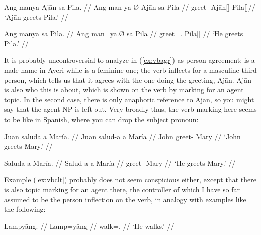 \pex %
\a\label{ex:vbagr}\begingl
	\gla Ang manya {} Ajān sa Pila. //
	\glb Ang man-ya Ø Ajān sa Pila //
	\glc \AgtT{} greet-\TsgM{} \Top{} ​Ajān[\TsgM{}] \Parg{} Pila[\TsgF{}]//
	\glft `Ajān greets Pila.' //
\endgl

\a\label{ex:vbclt}\begingl
	\gla Ang manya sa Pila. //
	\glb Ang man=ya.Ø sa ​Pila //
	\glc \AgtT{} greet=\TsgM{}.\Top{} \Parg{} ​Pila[\TsgF{}] //
	\glft `He greets Pila.' //
\endgl

\xe

It is probably uncontroversial to analyze  in (\ref{ex:vbagr}) as 
person agreement:  is a male name in Ayeri while 
 is a feminine one; the verb inflects for a masculine third 
person, which tells us that it agrees with the one doing the greeting, 
Ajān. Ajān is also who this is about, which is shown on the verb by marking for 
an agent topic. In the second case, there is only anaphoric reference to Ajān, 
so you might say that the agent NP is left out. Very broadly thus, the verb 
marking here seems to be like in Spanish, where you can drop the subject 
pronoun:

\pex %
\a\label{ex:vbagrspann}\begingl{}%
	\gla Juan saluda a María. //
	\glb Juan salud-a a María //
	\glc John greet-\Tsg{} \Acc{} Mary //
	\glft `John greets Mary.' //
\endgl

\a\label{ex:vbagrspapr}\begingl
	\gla Saluda a María. //
	\glb Salud-a a María //
	\glc greet-\Tsg{} \Acc{} Mary //
	\glft `He greets Mary.' //
\endgl

\xe

Example (\ref{ex:vbclt}) probably does not seem conspicious either, except that 
there is also topic marking for an agent there, the controller of which I have 
so far assumed to be the person inflection on the verb, in analogy 
with examples like the following:

\ex\label{ex:lampyaang} %
\begingl
	\gla Lampyāng. //
	\glb Lamp=yāng //
	\glc walk=\TsgM{}.\Aarg{} //
	\glft `He walks.' //
\endgl\xe

